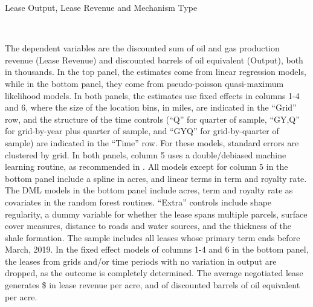\documentclass[12pt]{article}
\newcommand{\inputy}[1]{\unskip}
\begin{document}
\addtolength{\tabcolsep}{6pt}
\begin{table}[htbp]
	\caption{Lease Output, Lease Revenue and Mechanism Type \label{tab:output_stacked}}
	\begin{threeparttable}
	\small
	 \\
		\begin{tablenotes}
		\footnotesize
		\item The dependent variables are the discounted sum of oil and gas production revenue (Lease Revenue) and discounted barrels of oil equivalent (Output), both in thousands.  In the top panel, the estimates come from linear regression models, while in the bottom panel, they come from pseudo-poisson quasi-maximum likelihood models.  In both panels, the estimates use fixed effects in columns 1-4 and 6, where the size of the location bins, in miles, are indicated in the ``Grid'' row, and the structure of the time controls (``Q'' for quarter of sample, ``GY,Q'' for grid-by-year plus quarter of sample, and ``GYQ'' for grid-by-quarter of sample) are indicated in the ``Time'' row.  For these models, standard errors are clustered by grid.  In both panels, column 5 uses a double/debiased machine learning routine, as recommended in  \cite{chernozhukov2018double}.  All models except for column 5 in the bottom panel include a spline in acres, and linear terms in term and royalty rate. The DML models in the bottom panel include acres, term and royalty rate as covariates in the random forest routines. ``Extra'' controls include shape regularity, a dummy variable for whether the lease spans multiple parcels, surface cover measures, distance to roads and water sources, and the thickness of the shale formation.  The sample includes all leases whose primary term ends before March, 2019.  In the fixed effect models of columns 1-4 and 6 in the bottom panel, the leases from grids and/or time periods with no variation in output are dropped, as the outcome is completely determined.  The average negotiated lease generates \$\inputy{../output/estimates/negotiation_avg_revenue.tex} in lease revenue per acre, and \inputy{../output/estimates/negotiation_avg_dboe.tex} of discounted barrels of oil equivalent per acre.    
		\end{tablenotes}	   
	\end{threeparttable}
\end{table}
\addtolength{\tabcolsep}{-6pt}
\end{document}
